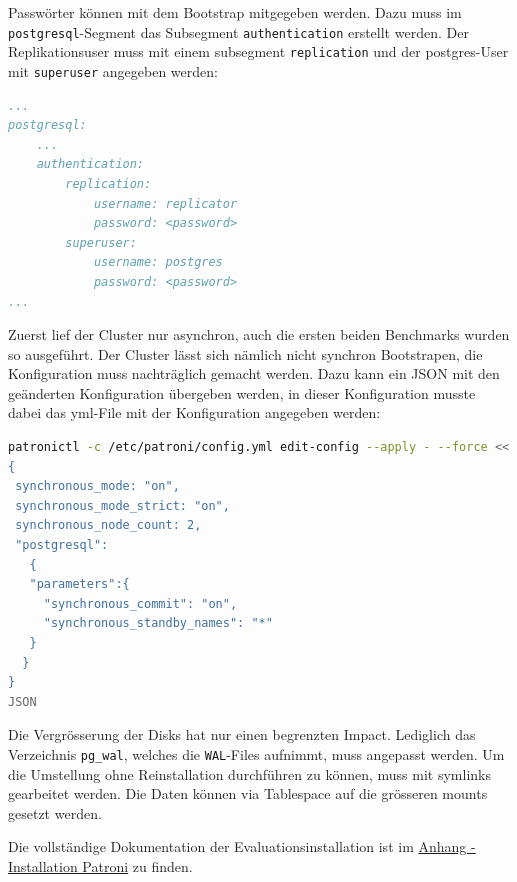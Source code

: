 \begin{flushleft}
    Passwörter können mit dem Bootstrap mitgegeben werden.
    Dazu muss im \texttt{postgresql}-Segment das Subsegment \texttt{authentication} erstellt werden.
    Der Replikationsuser muss mit einem subsegment \texttt{replication} und der postgres-User mit \texttt{superuser} angegeben werden:
\lstset{style=gra_codestyle}
\begin{lstlisting}[language=yaml, caption=Patroni - Passwörter,captionpos=b,label={lst:patroni_passwords},breaklines=true]
...
postgresql:
    ...
    authentication:
        replication:
            username: replicator
            password: <password>
        superuser:
            username: postgres
            password: <password>
...
\end{lstlisting}
\end{flushleft}
{}
\recalctypearea
\begin{flushleft}
    Zuerst lief der Cluster nur asynchron, auch die ersten beiden Benchmarks wurden so ausgeführt.
    Der Cluster lässt sich nämlich nicht synchron Bootstrapen, die Konfiguration muss nachträglich gemacht werden.
    Dazu kann ein JSON mit den geänderten Konfiguration übergeben werden, in dieser Konfiguration musste dabei das yml-File mit der Konfiguration angegeben werden:
\lstset{style=gra_codestyle}
\begin{lstlisting}[language=bash, caption=Patroni - Synchrone Replikation setzen,captionpos=b,label={lst:patroni_set_sync_replication},breaklines=true]
patronictl -c /etc/patroni/config.yml edit-config --apply - --force <<'JSON'
{
 synchronous_mode: "on",
 synchronous_mode_strict: "on",
 synchronous_node_count: 2,
 "postgresql":
   {
   "parameters":{
     "synchronous_commit": "on",
     "synchronous_standby_names": "*"
   }
  }
}
JSON
\end{lstlisting}
\end{flushleft}
\begin{flushleft}
    Die Vergrösserung der Disks hat nur einen begrenzten Impact.
    Lediglich das Verzeichnis \texttt{pg\_wal}, welches die \texttt{WAL}-Files aufnimmt, muss angepasst werden.
    Um die Umstellung ohne Reinstallation durchführen zu können, muss mit symlinks gearbeitet werden.
    Die Daten können via Tablespace auf die grösseren mounts gesetzt werden.
\end{flushleft}
\begin{flushleft}
    Die vollständige Dokumentation der Evaluationsinstallation ist im \hyperref[subsec:evaluation_installation_patroni]{Anhang - Installation Patroni} zu finden.
\end{flushleft}